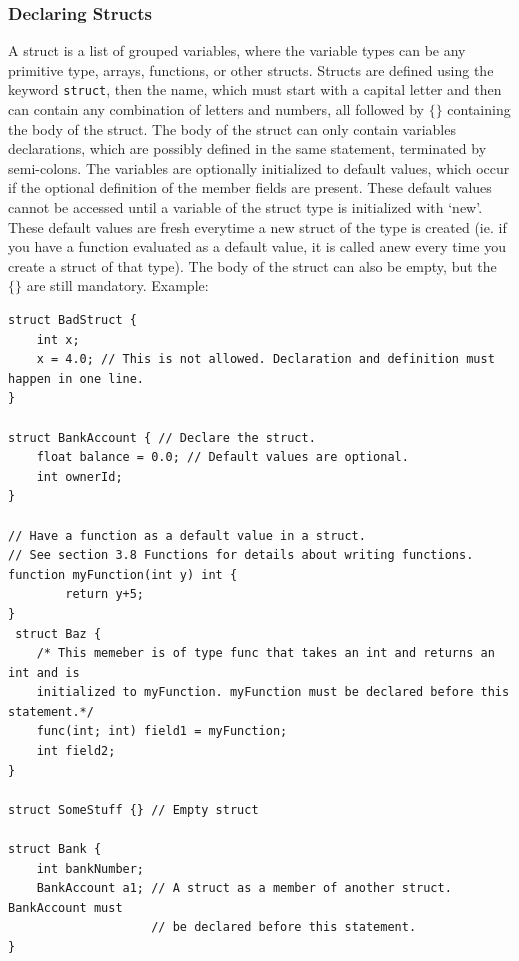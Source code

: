 \documentclass[12pt]{article}
\begin{document}
\subsubsection{Declaring Structs}
A struct is a list of grouped variables, where the variable types can be any primitive type, arrays, functions, or other structs. Structs are defined using the keyword \lstinline!struct!, then the name, which must start with a capital letter and then can contain any combination of letters and numbers, all followed by $\{ \}$ containing the body of the struct. The body of the struct can only contain variables declarations, which are possibly defined in the same statement, terminated by semi-colons. The variables are optionally initialized to default values, which occur if the optional definition of the member fields are present. These default values cannot be accessed until a variable of the struct type is initialized with `new'. These default values are fresh everytime a new struct of the type is created (ie. if you have a function evaluated as a default value, it is called anew every time you create a struct of that type). The body of the struct can also be empty, but the $\{ \}$ are still mandatory. Example: 
\begin{lstlisting}
struct BadStruct {
    int x;
    x = 4.0; // This is not allowed. Declaration and definition must happen in one line. 
}

struct BankAccount { // Declare the struct.
    float balance = 0.0; // Default values are optional. 
    int ownerId;
}

// Have a function as a default value in a struct.
// See section 3.8 Functions for details about writing functions.
function myFunction(int y) int {
        return y+5;
}
 struct Baz { 
    /* This memeber is of type func that takes an int and returns an int and is
    initialized to myFunction. myFunction must be declared before this statement.*/
    func(int; int) field1 = myFunction; 
    int field2;
}

struct SomeStuff {} // Empty struct

struct Bank { 
    int bankNumber;
    BankAccount a1; // A struct as a member of another struct. BankAccount must
                    // be declared before this statement. 
}
\end{lstlisting}
\end{document}
